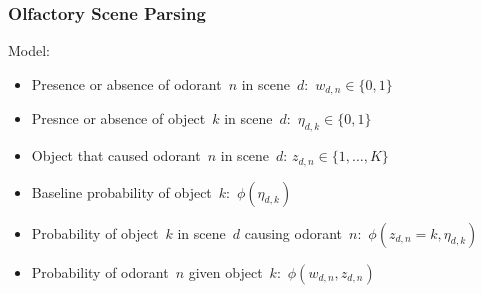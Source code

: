 \subsubsection{Olfactory Scene Parsing}


Model:
\begin{itemize}
\item Presence or absence of odorant~$n$ in scene~$d$:~$w_{d,n} \in \{0,1\}$
\item Presnce or absence of object~$k$ in scene~$d$:~$\eta_{d,k} \in \{0,1\}$
\item Object that caused odorant~$n$ in scene~$d$: $z_{d,n} \in \{1, \ldots, K\}$ 
\item Baseline probability of object~$k$:~$\phi(\eta_{d,k})$
\item Probability of object~$k$ in scene~$d$ causing odorant~$n$:~$\phi(z_{d,n}=k, \eta_{d,k})$
\item Probability of odorant~$n$ given object~$k$:~$\phi(w_{d,n}, z_{d,n})$
\end{itemize}


